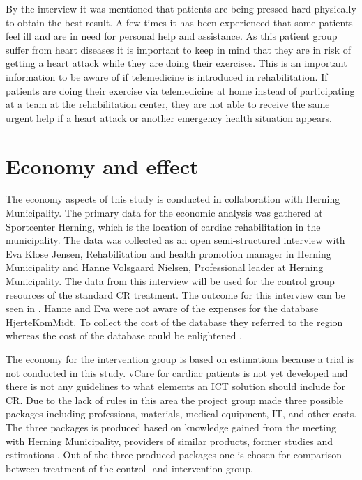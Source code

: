 By the interview it was mentioned that patients are being pressed hard physically to obtain the best result. A few times it has been experienced that some patients feel ill and are in need for personal help and assistance. As this patient group suffer from heart diseases it is important to keep in mind that they are in risk of getting a heart attack while they are doing their exercises. This is an important information to be aware of if telemedicine is introduced in rehabilitation. If patients are doing their exercise via telemedicine at home instead of participating at a team at the rehabilitation center, they are not able to receive the same urgent help if a heart attack or another emergency health situation appears.         

\section{Economy and effect}

The economy aspects of this study is conducted in collaboration with Herning Municipality. The primary data for the economic analysis was gathered at Sportcenter Herning, which is the location of cardiac rehabilitation in the municipality. The data was collected as an open semi-structured interview with Eva Klose Jensen, Rehabilitation and health promotion manager in Herning Municipality and Hanne Volsgaard Nielsen, Professional leader at Herning Municipality. The data from this interview will be used for the control group resources of the standard CR treatment. The outcome for this interview can be seen in . Hanne and Eva were not aware of the expenses for the database HjerteKomMidt. To collect the cost of the database they referred to the region whereas the cost of the database could be enlightened \cite{hjerteKomMidt}.

The economy for the intervention group is based on estimations because a trial is not conducted in this study. vCare for cardiac patients is not yet developed and there is not any guidelines to what elements an ICT solution should include for CR. Due to the lack of rules in this area the project group made three possible packages including professions, materials, medical equipment, IT, and other costs. The three packages is produced based on knowledge gained from the meeting with Herning Municipality, providers of similar products, former studies and estimations \cite{sofoklis, costeffect, effects, usingeffect}. Out of the three produced packages one is chosen for comparison between treatment of the control- and intervention group.

